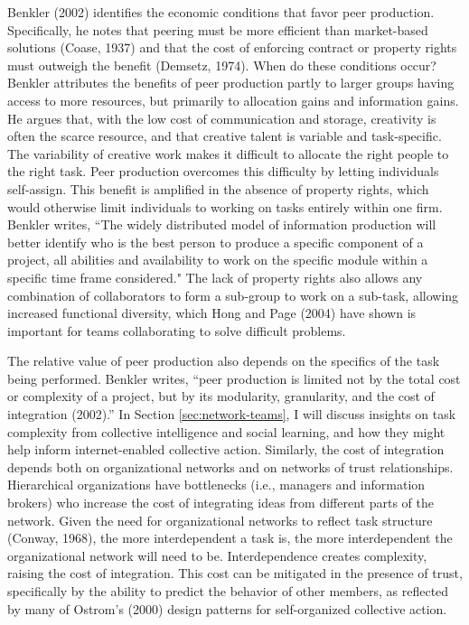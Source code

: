 Benkler (2002) identifies the economic conditions that favor peer production. Specifically, he notes that peering must be more efficient than market-based solutions (Coase, 1937) and that the cost of enforcing contract or property rights must outweigh the benefit (Demsetz, 1974). When do these conditions occur? Benkler attributes the benefits of peer production partly to larger groups having access to more resources, but primarily to allocation gains and information gains. He argues that, with the low cost of communication and storage, creativity is often the scarce resource, and that creative talent is variable and task-specific. The variability of creative work makes it difficult to allocate the right people to the right task. Peer production overcomes this difficulty by letting individuals self-assign. This benefit is amplified in the absence of property rights, which would otherwise limit individuals to working on tasks entirely within one firm. Benkler writes, ``The widely distributed model of information production will better identify who is the best person to produce a specific component of a project, all abilities and availability to work on the specific module within a specific time frame considered." The lack of property rights also allows any combination of collaborators to form a sub-group to work on a sub-task, allowing increased functional diversity, which Hong and Page (2004) have shown is important for teams collaborating to solve difficult problems.

The relative value of peer production also depends on the specifics of the task being performed. Benkler writes, ``peer production is limited not by the total cost or complexity of a project, but by its modularity, granularity, and the cost of integration (2002).'' In Section \ref{sec:network-teams}, I will discuss insights on task complexity from collective intelligence and social learning,
and how they might help inform internet-enabled collective action. Similarly, the cost of integration depends both on organizational networks and on networks of trust relationships. Hierarchical organizations have bottlenecks (i.e., managers and information brokers) who increase the cost of integrating ideas from different parts of the network. Given the need for organizational networks to reflect task structure (Conway, 1968), the more interdependent a task is, the more interdependent the organizational network will need to be. Interdependence creates complexity, raising the cost of integration. This cost can be mitigated in the presence of trust, specifically by the ability to predict the behavior of other members, as reflected by many of Ostrom's (2000) design patterns for self-organized collective action.

